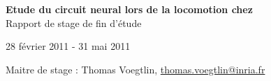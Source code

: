 
\vspace*{\fill}
\begin{center}
   \textbf{ {\Huge Etude du circuit neural lors de la locomotion chez \caeleg{}}}\\[0.5em]{\huge Rapport de stage de fin d'étude}
\end{center}

\begin{center}
  28 février 2011 - 31 mai 2011
\end{center}

\begin{center}
   Maitre de stage : Thomas Voegtlin, \url{thomas.voegtlin@inria.fr}
\end{center}

\vspace*{\fill}

\newpage
